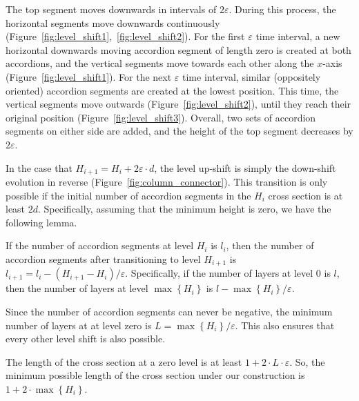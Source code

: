 The top segment moves downwards in intervals of $2\varepsilon$.
During this process, the horizontal segments move downwards continuously (Figure~\ref{fig:level_shift1},~\ref{fig:level_shift2}).
For the first $\varepsilon$ time interval, a new horizontal downwards moving accordion segment of length zero is created at both accordions,
and the vertical segments move towards each other along the $x$-axis (Figure~\ref{fig:level_shift1}).
For the next $\varepsilon$ time interval, similar (oppositely oriented) accordion segments are created at the lowest position.
This time, the vertical segments move outwards (Figure~\ref{fig:level_shift2}),
until they reach their original position (Figure~\ref{fig:level_shift3}).
Overall, two sets of accordion segments on either side are added, and the height of the top segment decreases by $2\varepsilon$.

In the case that $H_{i+1} = H_i+2\varepsilon\cdot d$, the level up-shift
is simply the down-shift evolution in reverse (Figure~\ref{fig:column_connector}).
This transition is only possible if the initial number of accordion segments in the $H_i$ cross section is at least $2d$.
Specifically, assuming that the minimum height is zero, we have the following lemma.
\begin{lemma}
\label{lem:layer_change}
If the number of accordion segments at level $H_i$ is $l_i$,
then the number of accordion segments after transitioning to level $H_{i+1}$ is $l_{i+1} = l_i - (H_{i+1}-H_i)/\varepsilon$.
Specifically, if the number of layers at level $0$ is $l$, then the number of layers
at level $\max\left\{ H_i\right\}$ is $l - \max\left\{ H_i\right\}/\varepsilon$.
\end{lemma}
\begin{corollary}
\label{cor:layer_limit}
Since the number of accordion segments can never be negative, the minimum number of layers at at level zero
is $L = \max\left\{ H_i\right\}/\varepsilon$. This also ensures that every other level shift is also possible.
\end{corollary}
\begin{corollary}
\label{cor:column_cross_section_length}
The length of the cross section at a zero level is at least $1 + 2\cdot L\cdot \varepsilon$.
So, the minimum possible length of the cross section under our construction is $1 + 2\cdot\max\left\{ H_i\right\}$.
\end{corollary}

